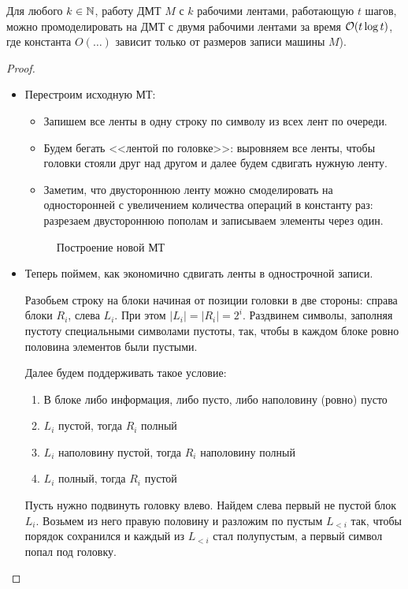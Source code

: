 \begin{thm}\label{th:two_bands}
	Для любого $ k \in \mathbb{N}$, работу ДМТ  $ M$ с $ k$ рабочими лентами, работающую $ t$ шагов, можно  промоделировать на  ДМТ с двумя рабочими лентами за время  $ \mathcal{O}(t \log t)$,
	где константа $ O(\ldots ) $ зависит только от размеров записи машины $ M$).
\end{thm}
\begin{proof}
	\begin{itemize}
		\item
			Перестроим исходную МТ:
			\begin{itemize}
				\item Запишем все ленты в одну строку  по символу из всех лент по очереди.
				\item  Будем бегать <<лентой по головке>>: выровняем все ленты, чтобы головки стояли друг над  другом и далее будем сдвигать нужную ленту.
				\item Заметим, что двустороннюю ленту можно смоделировать на односторонней с увеличением количества операций в константу раз: разрезаем двустороннюю пополам и записываем элементы через один.
			\end{itemize}
			\begin{figure}[ht]
				\centering
				\caption{Построение новой МТ}
				\label{fig:two-bands}
			\end{figure}
		\item
			Теперь поймем, как экономично сдвигать ленты в однострочной записи.

			Разобьем строку на блоки начиная от позиции головки в две стороны: справа блоки $ R_i$, слева $ L_i$. При этом $ \lvert L_i \rvert = \lvert R_i \rvert  = 2^{i}$. Раздвинем символы, заполняя пустоту специальными символами пустоты, так, чтобы в каждом блоке ровно половина элементов были пустыми.

			Далее будем поддерживать такое условие:
			\begin{enumerate}[noitemsep]
				\item В блоке либо информация, либо пусто, либо наполовину (ровно) пусто
				\item $ L_i$ пустой, тогда  $ R_i$ полный
				\item  $ L_i$ наполовину пустой, тогда $ R_i$ наполовину полный
				\item $ L_i$ полный, тогда $ R_i$ пустой
			\end{enumerate}

			Пусть нужно подвинуть головку влево. Найдем слева первый не пустой блок $ L_i$. Возьмем из него правую половину и разложим по пустым $ L_{<i}$ так, чтобы порядок сохранился и каждый из $ L_{<i}$ стал полупустым, а первый символ попал под головку.


\end{itemize}
\end{proof}
